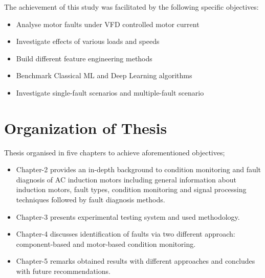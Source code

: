 The achievement of this study was facilitated by the following specific objectives:
\begin{itemize}
\item Analyse motor faults under VFD controlled motor current
\item Investigate effects of various loads and speeds
\item Build different feature engineering methods 
\item Benchmark Classical ML and Deep Learning algorithms
\item Investigate single-fault scenarios and multiple-fault scenario 
\end{itemize}

\section{Organization of Thesis}
\label{organization}

Thesis organised in five chapters to achieve aforementioned objectives;
\begin{itemize}
\item Chapter-2 provides an in-depth background to condition monitoring and fault diagnosis of AC induction motors including general information about induction motors, fault types, condition monitoring and signal processing techniques followed by fault diagnosis methods.

\item Chapter-3 presents experimental testing system and used methodology.

\item Chapter-4 discusses identification of faults via two different approach: component-based and motor-based condition monitoring.

\item Chapter-5 remarks obtained results with different approaches and concludes with future recommendations.

\end{itemize}